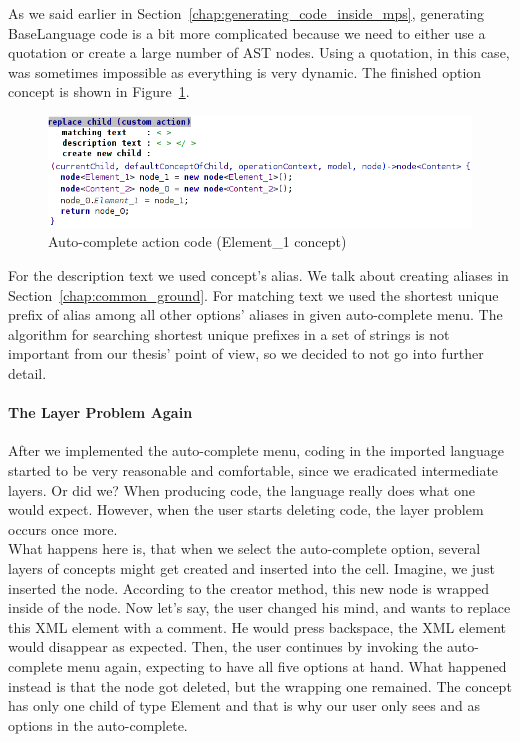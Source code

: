 As we said earlier in Section~\ref{chap:generating_code_inside_mps}, generating BaseLanguage code is a bit more complicated because we need to either use a quotation or create a large number of AST nodes.
Using a quotation, in this case, was sometimes impossible as everything is very dynamic.
The finished option concept is shown in Figure~\ref{fig:autocomplete_action}.

\begin{figure}[h]
	\centering
	\includegraphics[width=\textwidth]{./img/autocomplete_action.png}
	\caption{Auto-complete action code (Element{\_}1 concept)}
	\label{fig:autocomplete_action}
\end{figure}

For the description text we used concept's alias.
We talk about creating aliases in Section~\ref{chap:common_ground}.
For matching text we used the shortest unique prefix of alias among all other options' aliases in given auto-complete menu.
The algorithm for searching shortest unique prefixes in a set of strings is not important from our thesis' point of view, so we decided to not go into further detail.


\paragraph{The Layer Problem Again}

After we implemented the auto-complete menu, coding in the imported language started to be very reasonable and comfortable, since we eradicated intermediate layers.
Or did we?
When producing code, the language really does what one would expect.
However, when the user starts deleting code, the layer problem occurs once more.
\\

What happens here is, that when we select the auto-complete option, several layers of concepts might get created and inserted into the cell.
Imagine, we just inserted the  node.
According to the creator method, this new node is wrapped inside of the  node.
Now let's say, the user changed his mind, and wants to replace this XML element with a comment.
He would press backspace, the XML element would disappear as expected.
Then, the user continues by invoking the auto-complete menu again, expecting to have all five options at hand.
What happened instead is that the  node got deleted, but the wrapping  one remained.
The  concept has only one child of type Element and that is why our user only sees  and  as options in the auto-complete.


